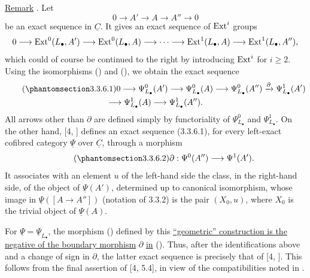\underline{Remark} . Let
\[
 0\longrightarrow A'\longrightarrow A\longrightarrow A''
 \longrightarrow0
\]
be an exact sequence in $\underline C$. It gives an exact sequence
of $\operatorname{Ext}^i$ groups
\[
 0\longrightarrow\operatorname{Ext}^0(L_\bullet,A')
 \longrightarrow\operatorname{Ext}^0(L_\bullet,A)
 \longrightarrow\cdots\longrightarrow\operatorname{Ext}^1(L_\bullet,A)
 \longrightarrow\operatorname{Ext}^1(L_\bullet,A''),
\]
which could of course be continued to the right by introducing
$\operatorname{Ext}^i$ for $i\geq2$. Using the isomorphisms () and (),
we obtain the exact sequence
\begin{multline}\tag{\SGARefTarget{sga7.sga7i.evii.n3-3-6-1}{3.3.6.1}}
 0\longrightarrow\Psi^0_{L_\bullet}(A')
 \longrightarrow\Psi^0_{L_\bullet}(A)
 \longrightarrow\Psi^0_{L_\bullet}(A'')
 \xrightarrow{\partial}\Psi^1_{L_\bullet}(A')\\
 \longrightarrow\Psi^1_{L_\bullet}(A)
 \longrightarrow\Psi^1_{L_\bullet}(A'').
\end{multline}
All arrows other than $\partial$ are defined simply by functoriality
of $\Psi^0_{L_\bullet}$ and $\Psi^1_{L_\bullet}$. On the other hand,
[4, ] defines an exact sequence (3.3.6.1), for every left-exact
cofibred category $\underline\Psi$ over $\underline C$, through a
morphism
\begin{equation}\tag{\SGARefTarget{sga7.sga7i.evii.n3-3-6-2}{3.3.6.2}}
 \partial:\Psi^0(A'')\longrightarrow\Psi^1(A').
\end{equation}
It associates with an element $u$ of the left-hand side the class,
in the right-hand side, of the object of $\underline\Psi(A')$,
determined up to canonical isomorphism, whose image in
$\underline\Psi([A\longrightarrow A''])$ (notation of 3.3.2) is the
pair $(X_0,u)$, where $X_0$ is the trivial object of
$\underline\Psi(A)$.

For $\underline\Psi=\underline\Psi_{L_\bullet}$, the morphism
() defined by this \underline{``geometric'' construction is
the negative of the boundary morphism} $\partial$ \underline{in}
(). Thus, after the identifications above and a change of
sign in $\partial$, the latter exact sequence is precisely that of
[4, ]. This follows from the final assertion of [4, 5.4], in
view of the compatibilities noted in .

